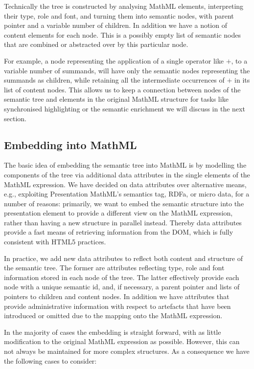 \documentclass{llncs}
\begin{document}
Technically the tree is constructed by analysing MathML elements, interpreting
their type, role and font, and turning them into semantic nodes, with parent
pointer and a variable number of children.  In addition we have a notion of
content elements for each node. This is a possibly empty list of semantic nodes
that are combined or abstracted over by this particular node.

For example, a node representing the application of a single operator like $+$,
to a variable number of summands, will have only the semantic nodes representing
the summands as children, while retaining all the intermediate occurrences of
$+$ in its list of content nodes. This allows us to keep a connection between
nodes of the semantic tree and elements in the original MathML structure for
tasks like synchronised highlighting or the semantic enrichment we will discuss
in the next section.


\subsection{Embedding into MathML}
\label{sec:embedding}

The basic idea of embedding the semantic tree into MathML is by modelling the
components of the tree via additional data attributes in the single elements of
the MathML expression. We have decided on data attributes over alternative
means, e.g., exploiting Presentation MathML's semantics tag, RDFa, or micro
data, for a number of reasons: primarily, we want to embed the semantic
structure into the presentation element to provide a different view on the
MathML expression, rather than having a new structure in parallel instead.
Thereby data attributes provide a fast means of retrieving information from the
DOM, which is fully consistent with HTML5 practices.

In practice, we add new data attributes to reflect both content and structure of
the semantic tree. The former are attributes reflecting type, role and font
information stored in each node of the tree. The latter effectively provide each
node with a unique semantic id, and, if necessary, a parent pointer and lists of
pointers to children and content nodes. In addition we have attributes that
provide administrative information with respect to artefacts that have been
introduced or omitted due to the mapping onto the MathML expression.

In the majority of cases the embedding is straight forward, with as little
modification to the original MathML expression as possible. However, this can
not always be maintained for more complex structures. As a consequence we have
the following cases to consider:
\end{document}
